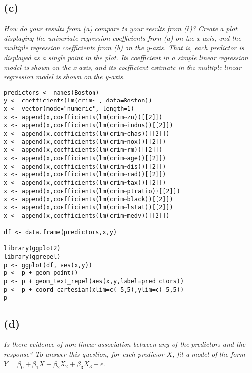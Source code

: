 \documentclass[a4paper,man,natbib]{apa6}
\begin{document}
\subsection{(c)}
\emph{
	How do your results from (a) compare to your results from (b)?
	Create a plot displaying the univariate regression coefficients
	from (a) on the x-axis, and the multiple regression coefficients
	from (b) on the y-axis. That is, each predictor is displayed as a
	single point in the plot. Its coefficient in a simple linear regression model is shown on the x-axis, and its coefficient estimate
	in the multiple linear regression model is shown on the y-axis.
} \\
\begin{verbatim}
predictors <- names(Boston)
y <- coefficients(lm(crim~., data=Boston))
x <- vector(mode="numeric", length=1)
x <- append(x,coefficients(lm(crim~zn))[[2]])
x <- append(x,coefficients(lm(crim~indus))[[2]])
x <- append(x,coefficients(lm(crim~chas))[[2]])
x <- append(x,coefficients(lm(crim~nox))[[2]])
x <- append(x,coefficients(lm(crim~rm))[[2]])
x <- append(x,coefficients(lm(crim~age))[[2]])
x <- append(x,coefficients(lm(crim~dis))[[2]])
x <- append(x,coefficients(lm(crim~rad))[[2]])
x <- append(x,coefficients(lm(crim~tax))[[2]])
x <- append(x,coefficients(lm(crim~ptratio))[[2]])
x <- append(x,coefficients(lm(crim~black))[[2]])
x <- append(x,coefficients(lm(crim~lstat))[[2]])
x <- append(x,coefficients(lm(crim~medv))[[2]])

df <- data.frame(predictors,x,y)

library(ggplot2)
library(ggrepel)
p <- ggplot(df, aes(x,y)) 
p <- p + geom_point() 
p <- p + geom_text_repel(aes(x,y,label=predictors)) 
p <- p + coord_cartesian(xlim=c(-5,5),ylim=c(-5,5))
p
\end{verbatim}

\subsection{(d)}
\emph{
	Is there evidence of non-linear association between any of the
	predictors and the response? To answer this question, for each
	predictor $X$, fit a model of the form} \\
	$Y = \beta_0 + \beta_1X + \beta_2X_2 + \beta_3X_3 + \epsilon$.
	
\end{document}
